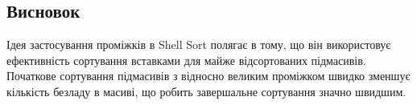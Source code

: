 \documentclass[12pt]{extarticle}
\begin{document}
\subsection*{Висновок} 
Ідея застосування проміжків в Shell 
Sort полягає в тому, що він використовує ефективність сортування
 вставками для майже відсортованих підмасивів. Початкове сортування
  підмасивів з відносно великим проміжком швидко зменшує кількість
   безладу в масиві, що робить завершальне сортування значно швидшим.
\end{document}
